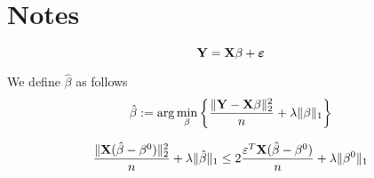\chapter{Notes}

\begin{equation}
    \label{def: linear model (matrix)}
    \mathbf{Y} = \mathbf{X} \beta + \boldsymbol{\varepsilon}
\end{equation}

We define $\hat \beta$ as follows
\begin{equation}
    \label{not: beta hat}
    \hat{\beta}:=\arg \min _{\beta}\left\{\frac{\|\mathbf{Y}-\mathbf{X} \beta\|_{2}^{2}}{n}+\lambda\|\beta\|_{1}\right\}
\end{equation}

\begin{lemma}
    $$\frac{\| \mathbf{X} (\hat{\beta}-\beta^{0})\|_{2}^{2}}{n} + \lambda\|\hat{\beta}\|_{1} \leq 2 \frac{\varepsilon^{T} \mathbf{X} (\hat{\beta}-\beta^{0})}{n}+\lambda\|\beta^{0}\|_{1}$$
\end{lemma}
